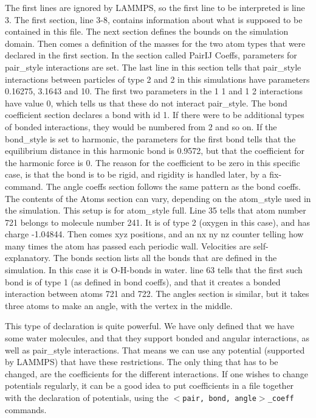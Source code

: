 The first lines are ignored by LAMMPS, so the first line to be interpreted is line 3. The first section, line 3-8, contains information about what is supposed to be contained in this file. The next section defines the bounds on the simulation domain. Then comes a definition of the masses for the two atom types that were declared in the first section. In the section called PairIJ Coeffs, parameters for pair\_style interactions are set. The last line in this section tells that pair\_style interactions between particles of type 2 and 2 in this simulations have parameters 0.16275, 3.1643 and 10. The first two parameters in the 1 1 and 1 2 interactions have value 0, which tells us that these do not interact pair\_style. The bond coefficient section declares a bond with id 1. If there were to be additional types of bonded interactions, they would be numbered from 2 and so on. If the bond\_style is set to harmonic, the parameters for the first bond tells that the equilibrium distance in this harmonic bond is 0.9572, but that the coefficient for the harmonic force is 0. The reason for the coefficient to be zero in this specific case, is that the bond is to be rigid, and rigidity is handled later, by a fix-command. The angle coeffs section follows the same pattern as the bond coeffs. The contents of the Atoms section can vary, depending on the atom\_style used in the simulation. This setup is for atom\_style full. Line 35 tells that atom number 721 belongs to molecule number 241. It is of type 2 (oxygen in this case), and has charge -1.04844. Then comes xyz positions, and an nx ny nz counter telling how many times the atom has passed each periodic wall. Velocities are self-explanatory. The bonds section lists all the bonds that are defined in the simulation. In this case it is O-H-bonds in water. line 63 tells that the first such bond is of type 1 (as defined in bond coeffs), and that it creates a bonded interaction between atoms 721 and 722. The angles section is similar, but it takes three atoms to make an angle, with the vertex in the middle. 

This type of declaration is quite powerful. We have only defined that we have some water molecules, and that they support bonded and angular interactions, as well as pair\_style interactions. That means we can use any potential (supported by LAMMPS) that have these restrictions. The only thing that has to be changed, are the coefficients for the different interactions. If one wishes to change potentials regularly, it can be a good idea to put coefficients in a file together with the declaration of potentials, using the {\tt $<$pair, bond, angle$>$\_coeff } commands. 

